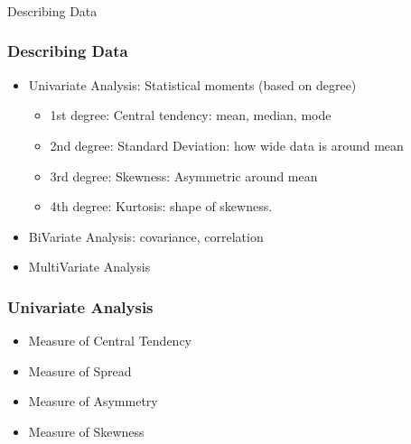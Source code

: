 \begin{frame}[fragile]\frametitle{}
\begin{center}
{\Large Describing Data}
\end{center}
\end{frame}

\begin{frame}[fragile]\frametitle{Describing Data}
\begin{itemize}
\item Univariate Analysis: Statistical moments (based on degree)
\begin{itemize}
\item 1st degree: Central tendency: mean, median, mode
\item 2nd degree: Standard Deviation: how wide data is around mean
\item 3rd degree: Skewness: Asymmetric around mean
\item 4th degree: Kurtosis: shape of skewness.
\end{itemize}
\item BiVariate Analysis: covariance, correlation
\item MultiVariate Analysis
\end{itemize}
\end{frame}


\begin{frame}[fragile]\frametitle{Univariate Analysis}
\begin{itemize}
\item Measure of Central Tendency
\item Measure of Spread
\item Measure of Asymmetry
\item Measure of Skewness
\end{itemize}
\end{frame}


%


